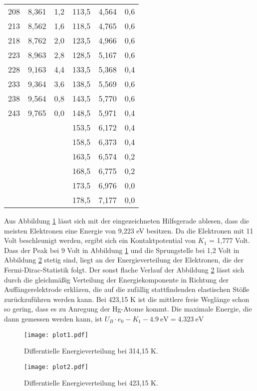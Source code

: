 \begin{table}
\begin{tabular}{c c c | c c c}
    208 & 8,361  & 1,2 & 113,5 & 4,564 & 0,6 \\
    213 & 8,562  & 1,6 & 118,5 & 4,765 & 0,6 \\
    218 & 8,762  & 2,0 & 123,5 & 4,966 & 0,6 \\
    223 & 8,963  & 2,8 & 128,5 & 5,167 & 0,6 \\
    228 & 9,163  & 4,4 & 133,5 & 5,368 & 0,4 \\
    233 & 9,364  & 3,6 & 138,5 & 5,569 & 0,6 \\
    238 & 9,564  & 0,8 & 143,5 & 5,770 & 0,6 \\
    243 & 9,765  & 0,0 & 148,5 & 5,971 & 0,4 \\
        &        &     & 153,5 & 6,172 & 0,4 \\
        &        &     & 158,5 & 6,373 & 0,4 \\
        &        &     & 163,5 & 6,574 & 0,2 \\
        &        &     & 168,5 & 6,775 & 0,2 \\
        &        &     & 173,5 & 6,976 & 0,0 \\
        &        &     & 178,5 & 7,177 & 0,0 \\

    \bottomrule
  \end{tabular}
\end{table}
Aus Abbildung \ref{fig:plot1} lässt sich mit der eingezeichneten Hilfsgerade ablesen, dass die meisten Elektronen eine Energie von 9,223 eV besitzen.
Da die Elektronen mit 11 Volt beschleunigt werden, ergibt sich ein Kontaktpotential von $K_1$ = 1,777 Volt.
Dass der Peak bei 9 Volt in Abbildung \ref{fig:plot1} und die Sprungstelle bei 1,2 Volt in Abbildung \ref{fig:plot2} stetig sind, liegt an der Energieverteilung der Elektronen, die der Fermi-Dirac-Statistik folgt.
Der sonst flache Verlauf der Abbildung \ref{fig:plot2} lässt sich durch die gleichmäßig Verteilung der Energiekomponente in Richtung der Auffängerelektrode erklären, die auf die zufällig stattfindenden elastischen Stöße zurückzuführen werden kann.
Bei 423,15 K ist die mittlere freie Weglänge schon so gering, dass es zu Anregung der Hg-Atome kommt.
Die maximale Energie, die dann gemessen werden kann, ist $U_B \cdot e_0 - K_1 - \SI{4.9}{\eV} = \SI{4.323}{\eV}$
\begin{figure}
  \centering
  \texttt{[image: plot1.pdf]}
  \caption{Differntielle Energieverteilung bei 314,15 K.}
  \label{fig:plot1}
\end{figure}
\begin{figure}
  \centering
  \texttt{[image: plot2.pdf]}
  \caption{Differntielle Energieverteilung bei 423,15 K.}
  \label{fig:plot2}
\end{figure}
\FloatBarrier

